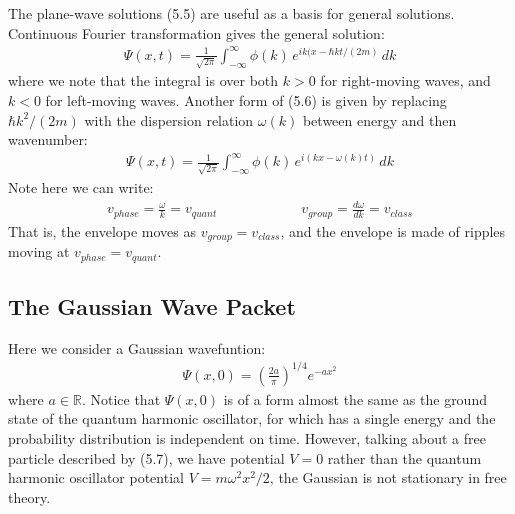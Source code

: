 \documentclass[11pt]{book}
\theoremstyle{break}
\theoremstyle{break}
\newcommand{\R}{\mathbb{R}}
\begin{document}
The plane-wave solutions (5.5) are useful as a basis for general solutions. Continuous Fourier transformation gives the general solution:
\begin{align}
\Psi(x,t) = \frac{1}{\sqrt{2\pi}}\int_{-\infty}^\infty \phi(k)\, e^{ik(x-\hbar kt/(2m)}\, dk
\end{align}
where we note that the integral is over both $k>0$ for right-moving waves, and $k<0$ for left-moving waves. Another form of (5.6) is given by replacing $\hbar k^2/(2m)$ with the dispersion relation $\omega(k) $ between energy and then wavenumber:
\begin{align*}
\Psi(x,t) = \frac{1}{\sqrt{2\pi}}\int_{-\infty}^\infty \phi(k) \, e^{i(kx - \omega(k)t)}\, dk
\end{align*}
Note here we can write:
\begin{align*}
v_{phase} = \frac{\omega}{k} = v_{quant} \qquad\qquad\qquad v_{group} = \frac{d\omega}{dk} = v_{class}
\end{align*}
That is, the envelope moves as $v_{group} = v_{class}$, and the envelope is made of ripples moving at $v_{phase} = v_{quant}$. \\

\subsection{The Gaussian Wave Packet}
Here we consider a Gaussian wavefuntion:
\begin{align}
\Psi(x,0) = \left( \frac{2a}{\pi}\right)^{1/4}e^{-ax^2}
\end{align}
where $a \in \R$. Notice that $\Psi(x,0)$ is of a form almost the same as the ground state of the quantum harmonic oscillator, for which has a single energy and the probability distribution is independent on time. However, talking about a free particle described by (5.7), we have potential $V = 0$ rather than the quantum harmonic oscillator potential $V = m\omega^2x^2/2$, the Gaussian is not stationary in free theory.\\
\end{document}
